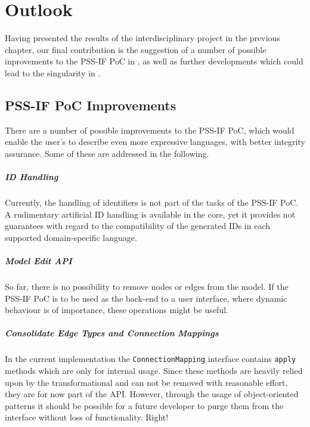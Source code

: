 \chapter{Outlook}
\label{chap:outlook}

Having presented the results of the interdisciplinary project in the previous chapter, our final contribution is the suggestion of a number of possible inprovements to the PSS-IF PoC in , as well as further developments which could lead to the \color{red}singularity    \color{black} in .

\section{PSS-IF PoC Improvements}
\label{sec:outlook:improvements}

There are a number of possible improvements to the PSS-IF PoC, which would enable the user's to describe even more expressive languages, with better integrity assurance. Some of these are addressed in the following.

\paragraph{ID Handling}

Currently, the handling of identifiers is not part of the tasks of the PSS-IF PoC. A rudimentary artificial ID handling is available in the core, yet it provides not guarantees with regard to the compatibility of the generated IDs in each supported domain-specific language.

\paragraph{Model Edit API}

So far, there is no possibility to remove nodes or edges from the model. If the PSS-IF PoC is to be used as the back-end to a user interface, where dynamic behaviour is of importance, these operations might be useful.

\paragraph{Consolidate Edge Types and Connection Mappings}

In the current implementation the \texttt{ConnectionMapping} interface contains \texttt{apply} methods which are only for internal usage. Since these methods are heavily relied upon by the transformational and can not be removed with reasonable effort, they are for now part of the API. However, through the usage of object-oriented patterns it should be possible for a future developer to purge them from the interface without loss of functionality. Right!

